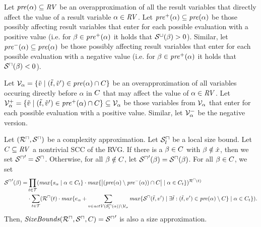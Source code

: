 \begin{definition}
  Let $\mathit{pre}(\alpha) \subseteq \mathit{RV}$ be an overapproximation of all the result variables that directly affect the value of a result variable $\alpha \in \mathit{RV}$.
  Let $\mathit{pre}^+(\alpha) \subseteq \mathit{pre}(\alpha)$ be those possibly affecting result variables that enter for each possible evaluation with a positive value
  (i.e. for $\beta \in \mathit{pre}^+(\alpha)$ it holds that ${\mathcal{S}^\sqcup}(\beta) > 0$).
  Similar, let $\mathit{pre}^-(\alpha) \subseteq \mathit{pre}(\alpha)$ be those possibly affecting result variables that enter for each possible evaluation with a negative value
  (i.e. for $\beta \in \mathit{pre}^+(\alpha)$ it holds that ${\mathcal{S}^\sqcap}(\beta) < 0$).
\end{definition}

\begin{definition}
  Let $\mathcal{V}_\alpha = \lbrace  \tilde{v} \mid (\tilde{t}, \tilde{v}') \in \mathit{pre}(\alpha) \cap C  \rbrace$ be an overapproximation of all variables occuring directly before $\alpha$ in $C$ that may affect the value of $\alpha \in \mathit{RV}$.
  Let $\mathcal{V}^+_\alpha = \lbrace  \tilde{v} \mid (\tilde{t}, \tilde{v}') \in \mathit{pre}^+(\alpha) \cap C  \rbrace \subseteq \mathcal{V}_\alpha$ be those variables from $\mathcal{V}_\alpha$ that enter for each possible evaluation with a positive value.
  Similar, let $\mathcal{V}^-_\alpha$ be the negative version.
\end{definition}

\begin{theorem}
  Let $({\mathcal{R}^\sqcap}, {\mathcal{S}^\sqcap})$ be a complexity approximation.
  Let ${\mathcal{S}^\sqcap_l}$ be a local size bound.
  Let $C \subseteq \mathit{RV}$ a nontrivial SCC of the RVG.
  If there is a $\beta \in C$ with $\beta \notin \dot{x}$, then we set ${\mathcal{S}^\sqcap}' = {\mathcal{S}^\sqcap}$.
  Otherwise, for all $\beta \notin C$, let ${\mathcal{S}^\sqcap}'(\beta) = {\mathcal{S}^\sqcap}(\beta)$.
  For all $\beta \in C$, we set
  \begin{align*}
    {\mathcal{S}^\sqcap}'(\beta) = & \prod_{t \in \mathcal{T}} (\mathit{max} \lbrace s_{\alpha} \mid \alpha \in C_t \rbrace
                       \cdot \mathit{max} \lbrace \left|(\mathit{pre}(\alpha) \setminus \mathit{pre}^-(\alpha)) \cap C\right| \mid \alpha \in C_t \rbrace)^{{\mathcal{R}^\sqcap}(t)} \\
                     & \cdot \sum_{t \in \mathcal{T}} ({\mathcal{R}^\sqcap}(t) \cdot \mathit{max} \lbrace  e_\alpha + \sum_{v \in \mathit{actV}({\mathcal{S}^\sqcap_l}(\alpha)) \setminus \mathcal{V}_\alpha} \mathit{max} \lbrace {\mathcal{S}^\sqcap}(\tilde{t}, v') \mid \exists \tilde{t}: (\tilde{t}, v') \in \mathit{pre}(\alpha) \setminus C \rbrace \mid \alpha \in C_t  \rbrace).
  \end{align*}
  Then, $\mathit{SizeBounds}({\mathcal{R}^\sqcap}, {\mathcal{S}^\sqcap}, C) = {\mathcal{S}^\sqcap}'$ is also a size approximation. 
\end{theorem}
